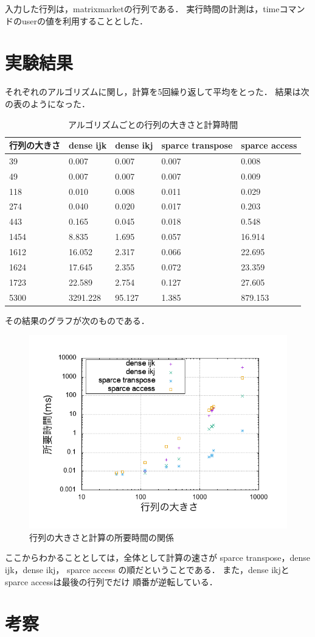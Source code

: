 \documentclass[11pt,a4paper]{jsarticle}
\begin{document}
入力した行列は，matrixmarketの行列である．
実行時間の計測は，timeコマンドのuserの値を利用することとした．


\section{実験結果}

それぞれのアルゴリズムに関し，計算を5回繰り返して平均をとった．
結果は次の表のようになった．

\begin{table}[H]
\begin{center}
\caption{アルゴリズムごとの行列の大きさと計算時間}
\begin{tabular}{lllll}
\hline
行列の大きさ& dense ijk & dense ikj & sparce transpose & sparce access \\ \hline 
39&0.007&0.007&0.007&0.008\\
49&0.007&0.007&0.007&0.009\\
118&0.010&0.008&0.011&0.029\\
274&0.040&0.020&0.017&0.203\\
443&0.165&0.045&0.018&0.548\\
1454&8.835&1.695&0.057&16.914\\
1612&16.052&2.317&0.066&22.695\\
1624&17.645&2.355&0.072&23.359\\
1723&22.589&2.754&0.127&27.605\\
5300&3291.228&95.127&1.385&879.153\\ \hline
\end{tabular}
\end{center}
\end{table}


その結果のグラフが次のものである．

\begin{figure}[H]
  \begin{center}
  \includegraphics[width=14cm]{../graph.png}
  \caption{行列の大きさと計算の所要時間の関係}
  \end{center}
\end{figure}

ここからわかることとしては，全体として計算の速さが
sparce transpose，dense ijk，dense ikj，
sparce access
の順だということである．
また，dense ikjとsparce accessは最後の行列でだけ
順番が逆転している．

\section{考察}
\end{document}
